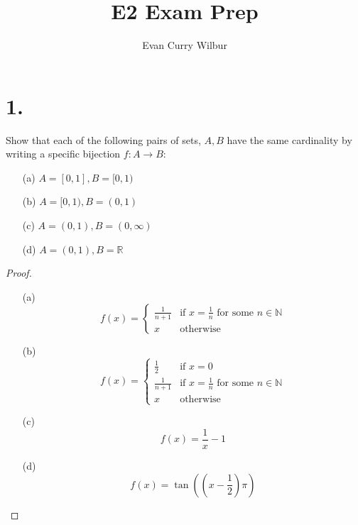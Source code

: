 \documentclass[]{article}
\title{E2 Exam Prep}
\author{Evan Curry Wilbur}
\begin{document}
\maketitle
 

\section*{1.}
Show that each of the following pairs of sets, $A, B$ have the same cardinality by writing a specific bijection $f : A \to B$:
\begin{enumerate}
	\item[(a)] $A = [0, 1], B = [0, 1)$
	\item[(b)] $A = [0, 1), B = (0, 1)$
	\item[(c)] $A = (0, 1), B = (0, \infty)$
	\item[(d)] $A = (0, 1), B = \mathbb{R}$
\end{enumerate}

\begin{proof}
	\begin{enumerate}
		\item[(a)]
		\begin{equation*}
			f(x) =
			\begin{cases}
				\frac{1}{n + 1} & \text{if } x = \frac{1}{n} \text{ for some } n \in \mathbb{N}\\
				x & \text{otherwise}
			\end{cases}
		\end{equation*}
		\item[(b)]
		\begin{equation*}
			f(x) =
			\begin{cases}
				\frac{1}{2} & \text{if } x = 0 \\
				\frac{1}{n + 1} & \text{if } x = \frac{1}{n} \text{ for some } n \in \mathbb{N}\\
				x & \text{otherwise}
			\end{cases}
		\end{equation*}
		\item[(c)]
		\begin{equation*}
			f(x) = \frac{1}{x} - 1
		\end{equation*}
		\item[(d)]
		\begin{equation*}
			f(x) = \tan\left(\left(x - \frac{1}{2}\right)\pi\right)
		\end{equation*}
	\end{enumerate}
\end{proof}
\end{document}
